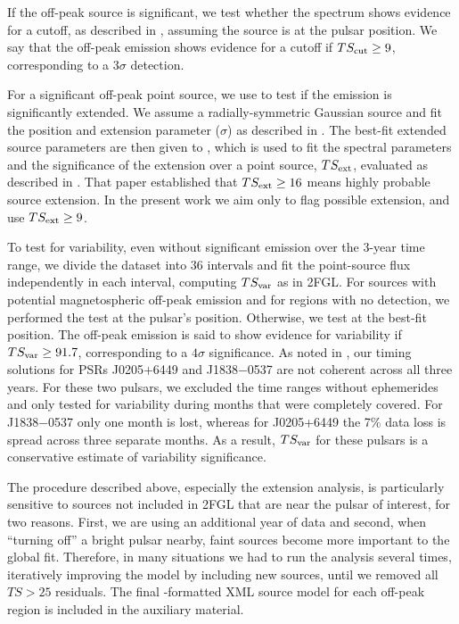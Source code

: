 If the off-peak source is significant, we test whether the spectrum shows
evidence for a cutoff, as described in 
\citet{ackermann_2011a_fermi-lat-search}, assuming the source is at
the pulsar position.  We say that the off-peak emission shows evidence for
a cutoff if $TS_{\rm cut}\geq9$, corresponding to a $3\sigma$ detection.

For a significant off-peak point source,
we use \pointlike to test if the emission is significantly
extended.  We assume a radially-symmetric Gaussian source
and fit the position and extension parameter ($\sigma$) as described
in \citet{lande_2012_search-spatially}.  The best-fit
extended source parameters are then given to \gtlike, which is used
to fit the spectral parameters and the significance of the extension
over a point source, $TS_{\rm ext}$, evaluated as described in
\citet{lande_2012_search-spatially}.  
That paper established that $TS_{\rm ext}\geq16$ means highly probable source extension.
In the present work we aim only to flag possible extension, and use  $TS_{\rm ext}\geq9$.

To test for variability, even without significant emission over the 3-year time
range, we divide the dataset into 36 intervals and fit the point-source
flux independently in each interval, 
computing $TS_{\rm var}$ as in 2FGL.  
For sources with potential magnetospheric off-peak emission and for
regions with no detection, we performed the test at the pulsar's position.
Otherwise, we test at the best-fit position.
The off-peak emission is said
to show evidence for variability if $TS_{\rm var}\geq91.7$, corresponding
to a $4\sigma$ significance.  
%
As noted in \citep{abdo_2013a_second-fermi}, our timing solutions for PSRs J0205+6449 and J1838$-$0537 are not  
coherent across all three years.  
For these two pulsars, we excluded the time ranges without ephemerides  
and only tested for variability during months that were completely covered.  
For J1838$-$0537 only one month is lost, whereas for J0205+6449 the 7\% data loss is spread across
three separate months.
As a result, $TS_{\rm var}$ for these pulsars is a conservative estimate of variability significance.

The procedure described above, especially the extension analysis,
is particularly sensitive to sources not included in 2FGL that are near the pulsar of interest,
for two reasons.
First, we are using an additional year of data and second,
when ``turning off'' a bright pulsar nearby, faint sources become more
important to the global fit.  Therefore, in many situations we had to run
the analysis several times, iteratively improving the model by including
new sources, until we removed all $TS>25$ residuals. The final
\gtlike-formatted XML source model for each off-peak 
region is included in the auxiliary material.

